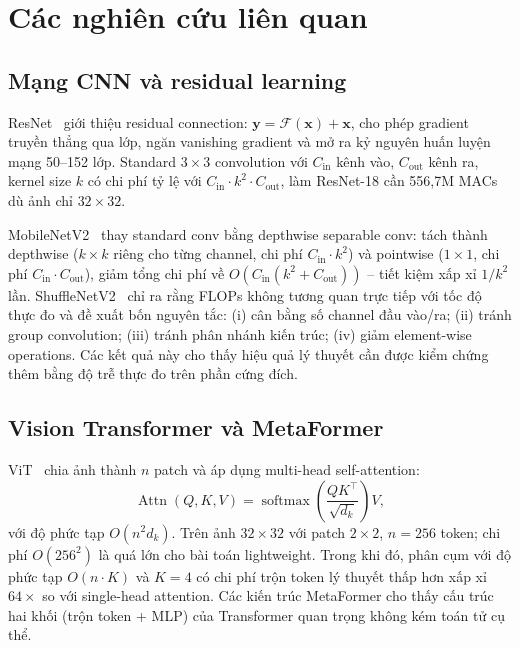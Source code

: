 \documentclass[conference]{IEEEtran}
\begin{document}
\section{Các nghiên cứu liên quan}
\label{sec:related}

\subsection{Mạng CNN và residual learning}

ResNet~\cite{He2016ResNet} giới thiệu residual connection:
$\mathbf{y} = \mathcal{F}(\mathbf{x}) + \mathbf{x}$,
cho phép gradient truyền thẳng qua lớp, ngăn vanishing gradient và
mở ra kỷ nguyên huấn luyện mạng 50--152 lớp. Standard $3\!\times\!3$
convolution với $C_{\mathrm{in}}$ kênh vào, $C_{\mathrm{out}}$ kênh ra,
kernel size $k$ có chi phí tỷ lệ với
$C_{\mathrm{in}}\!\cdot\!k^2\!\cdot\!C_{\mathrm{out}}$, làm ResNet-18
cần 556,7M MACs dù ảnh chỉ $32\!\times\!32$.

MobileNetV2~\cite{Sandler2018MobileNetV2} thay standard conv bằng
depthwise separable conv: tách thành depthwise ($k\!\times\!k$ riêng
cho từng channel, chi phí $C_{\mathrm{in}}\!\cdot\!k^2$) và pointwise
($1\!\times\!1$, chi phí $C_{\mathrm{in}}\!\cdot\!C_{\mathrm{out}}$),
giảm tổng chi phí về $O(C_{\mathrm{in}}(k^2 + C_{\mathrm{out}}))$ --
tiết kiệm xấp xỉ $1/k^2$ lần. ShuffleNetV2~\cite{Ma2018ShuffleNetV2}
chỉ ra rằng FLOPs không tương quan trực tiếp với tốc độ thực đo và
đề xuất bốn nguyên tắc: (i) cân bằng số channel đầu vào/ra; (ii)
tránh group convolution; (iii) tránh phân nhánh kiến trúc; (iv) giảm
element-wise operations. Các kết quả này cho thấy hiệu quả lý thuyết
cần được kiểm chứng thêm bằng độ trễ thực đo trên phần cứng đích.

\subsection{Vision Transformer và MetaFormer}

ViT~\cite{Dosovitskiy2021ViT} chia ảnh thành $n$ patch và áp dụng
multi-head self-attention:
\begin{equation}
  \operatorname{Attn}(Q,K,V) =
  \operatorname{softmax}\!\!\left(\frac{QK^\top}{\sqrt{d_k}}\right)\!V,
  \label{eq:attn}
\end{equation}
với độ phức tạp $O(n^2 d_k)$. Trên ảnh $32\!\times\!32$ với patch
$2\!\times\!2$, $n{=}256$ token; chi phí $O(256^2)$ là quá lớn cho
bài toán lightweight. Trong khi đó, phân cụm với độ phức tạp
$O(n\!\cdot\!K)$ và $K{=}4$ có chi phí trộn token lý thuyết thấp hơn
xấp xỉ $64\!\times$ so với single-head attention. Các kiến trúc
MetaFormer cho thấy cấu trúc hai khối (trộn token + MLP) của
Transformer quan trọng không kém toán tử cụ thể.
\end{document}
